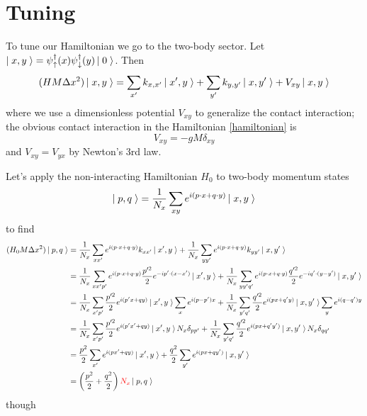 \section{Tuning}\label{sec:tuning}

To tune our Hamiltonian we go to the two-body sector.
Let $\left|\;x,y\;\right\rangle = \psi{}^{\dagger}_{\uparrow}(x) \psi{}^{\dagger}_{\downarrow}(y) \left|\;0\;\right\rangle$.
Then
\begin{equation}
	(HM\Delta x^2) \left|\;x,y\;\right\rangle = \sum_{x'} k_{x,x'}\left|\;x',y\;\right\rangle + \sum_{y'} k_{y,y'}\left|\;x,y'\;\right\rangle + V_{xy} \left|\;x,y\;\right\rangle
\end{equation}
where we use a dimensionless potential $V_{xy}$ to generalize the contact interaction;
the obvious contact interaction in the Hamiltonian \eqref{hamiltonian} is
\begin{equation}
	V_{xy} = - gM \delta_{xy}
\end{equation}
and $V_{xy}=V_{yx}$ by Newton's 3rd law.

Let's apply the non-interacting Hamiltonian $H_0$ to two-body momentum states
\begin{equation}
	\left|\;p,q\;\right\rangle = \frac{1}{N_x}\sum_{xy} e^{i(p\cdot x + q \cdot y)} \left|\;x,y\;\right\rangle
\end{equation}
to find
\begin{align}
	(H_0 M\Delta x^2) \left|\;p,q\;\right\rangle
	&=
			\frac{1}{N_x} \sum_{xx'} e^{i(p\cdot x + q \cdot y)} k_{xx'}\left|\;x',y\;\right\rangle
		+	\frac{1}{N_x} \sum_{yy'} e^{i(p\cdot x + q \cdot y)} k_{yy'}\left|\;x,y'\;\right\rangle
	\\
	&=
			\frac{1}{N_x} \sum_{xx'p'} e^{i(p\cdot x + q \cdot y)} \frac{p'^2}{2} e^{-i p'\cdot(x-x')}\left|\;x',y\;\right\rangle
		+	\frac{1}{N_x} \sum_{yy'q'} e^{i(p\cdot x + q \cdot y)} \frac{q'^2}{2} e^{-i q'\cdot(y-y')}\left|\;x,y'\;\right\rangle
	\\
	&=
			\frac{1}{N_x} \sum_{x'p'} \frac{p'^2}{2} e^{i(p'x+qy)} \left|\;x',y\;\right\rangle \sum_{x} e^{i(p-p')x}
		+	\frac{1}{N_x} \sum_{y'q'} \frac{q'^2}{2} e^{i(px+q'y)} \left|\;x,y'\;\right\rangle \sum_{y} e^{i(q-q')y}
	\\
	&=
			\frac{1}{N_x} \sum_{x'p'} \frac{p'^2}{2} e^{i(p'x'+qy)} \left|\;x',y\;\right\rangle N_x \delta_{pp'}
		+	\frac{1}{N_x} \sum_{y'q'} \frac{q'^2}{2} e^{i(px+q'y')} \left|\;x,y'\;\right\rangle N_x \delta_{qq'}
	\\
	&=
			\frac{p^2}{2}\sum_{x'} e^{i(px'+qy)} \left|\;x',y\;\right\rangle
		+	\frac{q^2}{2}\sum_{y'} e^{i(px+qy')} \left|\;x,y'\;\right\rangle
	\\
	&=
		\left(\frac{p^2}{2} + \frac{q^2}{2}\right) {\color{red} N_x} \left|\;p,q\;\right\rangle
\end{align}
though 

